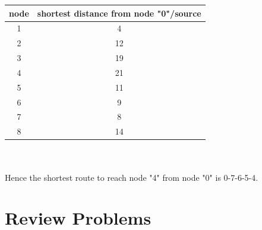 \begin{tabular}{c | c}
	\textbf{node} & \textbf{shortest distance from node "0"/source}\\
	\hline
	1 & 4\\
	2 & 12\\
	3 & 19\\
	4 & 21\\
	5 & 11\\
	6 & 9\\
	7 & 8\\
	8 & 14
\end{tabular}\\\\
Hence the shortest route to reach node "4" from node "0" is 0-7-6-5-4.
%
\section{Review Problems}
